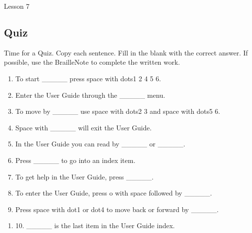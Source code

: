 \documentclass[10pt,letterpaper,twoside]{report}
\begin{document}
{{{{\clearpage

\newpage
Lesson 7

\subsection{Quiz}



Time for a Quiz.  Copy each sentence.  Fill in the blank with the correct answer.  If possible, use the BrailleNote to complete the written work.



\begin{enumerate}
	\item To start \_\_\_\_\_ press space with dots1 2 4 5 6.
	      
	      
	      
	\item Enter the User Guide through the \_\_\_\_\_ menu.
	      
	      
	      
	\item To move by \_\_\_\_\_ use space with dots2 3 and space with dots5 6.
	      
	      
	      
	\item Space with \_\_\_\_\_ will exit the User Guide.
	      
	      
	      
	\item In the User Guide you can read by \_\_\_\_\_ or \_\_\_\_\_.
	      
	      
	      
	\item Press \_\_\_\_\_ to go into an index item.
	      
	      
	      
	\item To get help in the User Guide, press \_\_\_\_\_.
	      
	      
	      
	\item To enter the User Guide, press o with space followed by \_\_\_\_\_.
	      
	      
	      
	\item Press space with dot1 or dot4 to move back or forward by \_\_\_\_\_.
\end{enumerate}



\begin{enumerate}
	\item 10.  \_\_\_\_\_  is the last item in the User Guide index.
\end{enumerate}





}}}}
\end{document}
